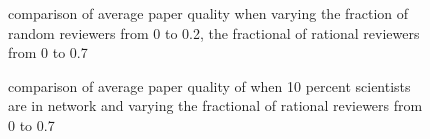 \documentclass[11pt]{article}
\begin{document}
\begin{figure}[!th]
\begin{center}
\caption{comparison of average paper quality when varying the fraction of random reviewers from 0 to 0.2, the fractional of rational reviewers from 0 to 0.7}
\end{center}
\end{figure}

\begin{figure}[!th]
\begin{center}
\caption{comparison of average paper quality of when 10 percent scientists are in network and varying the fractional of rational reviewers from 0 to 0.7}
\end{center}
\end{figure}
\end{document}
